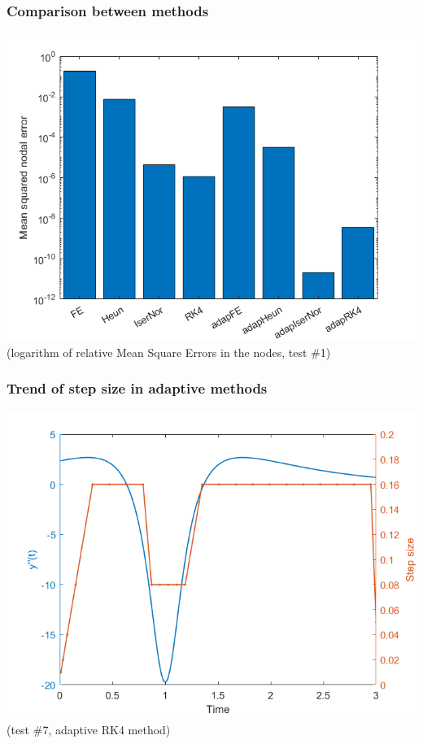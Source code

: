 \documentclass{beamer}
\begin{document}
\begin{frame} %
\frametitle{Comparison between methods}
\begin{center}
	\includegraphics[width=0.8\linewidth]{etc/MSE.png} \\
	(logarithm of relative Mean Square Errors in the nodes, test \#1)
\end{center}
\end{frame}


\begin{frame} %
	\frametitle{Trend of step size in adaptive methods}
	\begin{center}
		\includegraphics[width=0.8\linewidth]{etc/step_history_7_adapRK4.png} \\
		(test \#7, adaptive RK4 method)
	\end{center}	
\end{frame}
\end{document}
